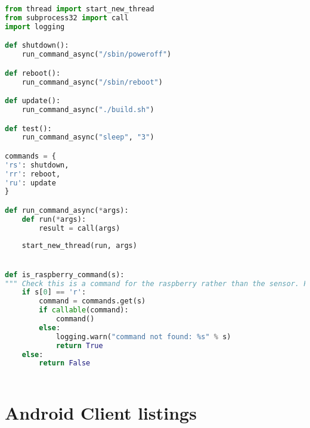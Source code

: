 \documentclass[hidelinks,11pt,a4paper,oneside,article]{memoir}
\begin{document}
\begin{lstlisting}[label={listing:rpi-subprocess},caption={Subprocess example},language=Python, style=styleprogrammingappendix]
from thread import start_new_thread
from subprocess32 import call
import logging

def shutdown():
    run_command_async("/sbin/poweroff")

def reboot():
    run_command_async("/sbin/reboot")

def update():
    run_command_async("./build.sh")

def test():
    run_command_async("sleep", "3")

commands = {
'rs': shutdown,
'rr': reboot,
'ru': update
}

def run_command_async(*args):
    def run(*args):
        result = call(args)
    
    start_new_thread(run, args)


def is_raspberry_command(s):
""" Check this is a command for the raspberry rather than the sensor. First letter must be an 'r'"""
    if s[0] == 'r':
        command = commands.get(s)
        if callable(command):
            command()
        else:
            logging.warn("command not found: %s" % s)
            return True
    else:
        return False



\end{lstlisting}\vspace{14pt}

%



\clearpage
{}

\chapter{Android Client listings}\label{appx:androidclient}
\end{document}
